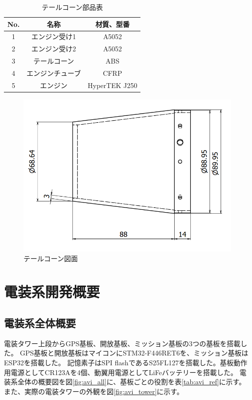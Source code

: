 \documentclass[a4paper,11pt,uplatex]{jsarticle}
\begin{document}
\begin{table}[H]
	\centering
	\caption{テールコーン部品表}
	\begin{tabular}{ccc} \toprule
		No. & 名称       & 材質、型番         \\ \midrule
		1   & エンジン受け1  & A5052         \\
		2   & エンジン受け2  & A5052         \\
		3   & テールコーン   & ABS           \\
		4   & エンジンチューブ & CFRP          \\
		5   & エンジン     & HyperTEK J250 \\ \bottomrule
	\end{tabular}
	\label{s_tale_table}
\end{table}

\begin{figure}[H]
	\centering
	\includegraphics[scale = 0.6]{pic_str/s_talecorn_zumen.png}
	\caption{テールコーン図面}
	\label{s_tale_zumen}
\end{figure}

\newpage
\section{電装系開発概要}
\subsection{電装系全体概要}

電装タワー上段からGPS基板、開放基板、ミッション基板の3つの基板を搭載した。
GPS基板と開放基板はマイコンにSTM32-F446RET6を、ミッション基板はESP32を搭載した。
記憶素子はSPI flashであるS25FL127を搭載した。基板動作用電源としてCR123Aを4個、動翼用電源としてLiFeバッテリーを搭載した。
電装系全体の概要図を図\ref{fig:avi_all}に、基板ごとの役割を表\ref{tab:avi_ref}に示す。
また、実際の電装タワーの外観を図\ref{fig:avi_tower}に示す。
\end{document}
